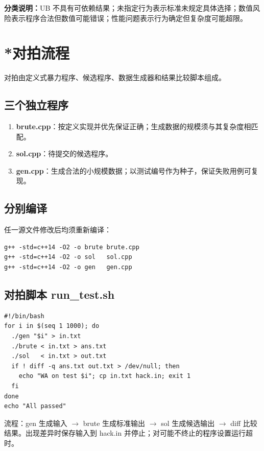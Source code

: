 \documentclass[a4paper,11pt]{article}
\begin{document}
{\small\noindent
\textbf{分类说明：}UB 不具有可依赖结果；未指定行为表示标准未规定具体选择；数值风险表示程序合法但数值可能错误；性能问题表示行为确定但复杂度可能超限。}

\newpage
\section{*对拍流程}

对拍由定义式暴力程序、候选程序、数据生成器和结果比较脚本组成。

\subsection*{三个独立程序}

\begin{enumerate}[itemsep=2pt]
  \item \textbf{brute.cpp}：按定义实现并优先保证正确；生成数据的规模须与其复杂度相匹配。
  \item \textbf{sol.cpp}：待提交的候选程序。
  \item \textbf{gen.cpp}：生成合法的小规模数据；以测试编号作为种子，保证失败用例可复现。
\end{enumerate}

\subsection*{分别编译}

任一源文件修改后均须重新编译：
{\small
\begin{verbatim}
g++ -std=c++14 -O2 -o brute brute.cpp
g++ -std=c++14 -O2 -o sol   sol.cpp
g++ -std=c++14 -O2 -o gen   gen.cpp
\end{verbatim}}

\subsection*{对拍脚本 run\_test.sh}

{\small
\begin{verbatim}
#!/bin/bash
for i in $(seq 1 1000); do
  ./gen "$i" > in.txt
  ./brute < in.txt > ans.txt
  ./sol   < in.txt > out.txt
  if ! diff -q ans.txt out.txt > /dev/null; then
    echo "WA on test $i"; cp in.txt hack.in; exit 1
  fi
done
echo "All passed"
\end{verbatim}}

流程：gen 生成输入 $\to$ brute 生成标准输出 $\to$ sol 生成候选输出 $\to$ diff 比较结果。出现差异时保存输入到 hack.in 并停止；对可能不终止的程序设置运行超时。
\end{document}
